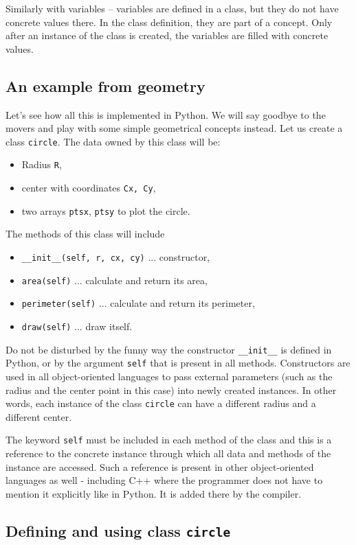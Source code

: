 \documentclass[article,A4,12pt]{llncs}
\begin{document}
Similarly with variables -- variables are defined in a class, but they do not 
have concrete values there. In the class definition, they are part of a concept. 
Only after an instance of the class is created, the variables are filled with 
concrete values. 

\subsection{An example from geometry}

Let's see how all this is implemented in Python. We will say goodbye to the movers
and play with some simple geometrical concepts instead. Let us create a class
{\tt circle}. The data owned by this class will be:

\begin{itemize}
\item Radius {\tt R}, 
\item center with coordinates {\tt Cx, Cy}, 
\item two arrays {\tt ptsx}, {\tt ptsy} to plot the circle. 
\end{itemize}
The methods of this class will include 
\begin{itemize}
\item {\tt \_\_init\_\_(self, r, cx, cy)} ... constructor,
\item {\tt area(self)} ... calculate and return its area,
\item {\tt perimeter(self)} ... calculate and return its perimeter,
\item {\tt draw(self)} ... draw itself.
\end{itemize}
Do not be disturbed by the funny way the constructor {\tt \_\_init\_\_} 
is defined in Python, or by the argument {\tt self} that is present 
in all methods. Constructors are 
used in all object-oriented languages to pass external parameters 
(such as the radius and the center point in this case) into newly 
created instances. In other words, each instance of the class {\tt circle} 
can have a different radius and a different center.

The keyword {\tt self} must be included in each method of the class 
and this is a reference to the concrete instance through which all
data and methods of the instance are accessed. Such a reference is present 
in other object-oriented languages as well - including C++ where the programmer
does not have to mention it explicitly like in Python. It is added there by 
the compiler.

\subsection{Defining and using class {\tt circle}} \label{subsec:circle}
\end{document}
